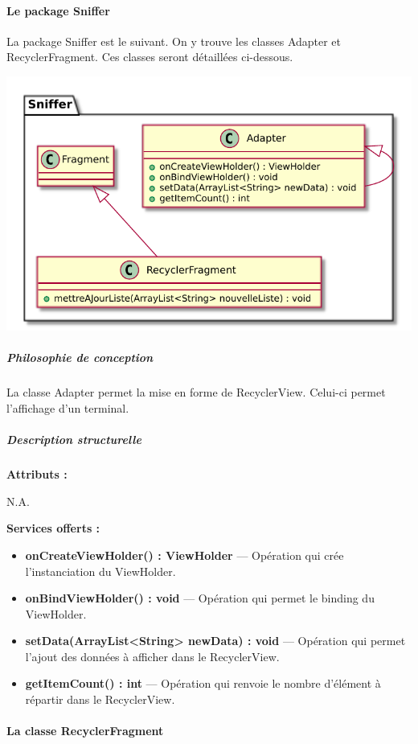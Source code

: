 \paragraph{Le package Sniffer}

La package Sniffer est le suivant. On y trouve les classes Adapter et RecyclerFragment. Ces classes seront détaillées ci-dessous.

\begin{minipage}
    {\linewidth}
    \centering
    \includegraphics[width=0.30\linewidth]{../schemas/Conception_detaillee/classe_sniffer.pdf}
\end{minipage}

\subparagraph{Philosophie de conception \newline} 

\medspace

La classe Adapter permet la mise en forme de RecyclerView. Celui-ci permet l'affichage d'un terminal. 

\subparagraph{Description structurelle \newline}

\medspace

\textbf{Attributs :}

N.A.

\textbf{Services offerts :}

\begin{itemize}
    \item \textbf{onCreateViewHolder() : ViewHolder } --- Opération qui crée l'instanciation du ViewHolder. 
    \item \textbf{onBindViewHolder() : void } --- Opération qui permet le binding du ViewHolder. 
    \item \textbf{setData(ArrayList<String> newData) : void } --- Opération qui permet l'ajout des données à afficher dans le RecyclerView.  
    \item \textbf{getItemCount() : int } --- Opération qui renvoie le nombre d'élément à répartir dans le RecyclerView. 
\end{itemize}



\paragraph{La classe RecyclerFragment}

